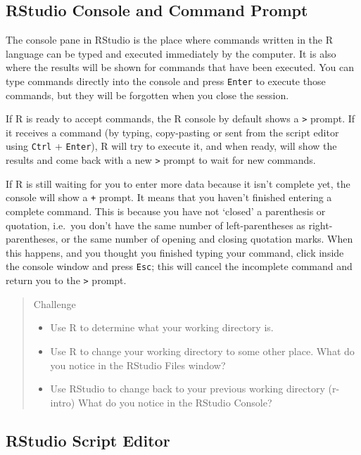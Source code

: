 \documentclass[
]{book}
\providecommand{\tightlist}{%
  \setlength{\itemsep}{0pt}\setlength{\parskip}{0pt}}
\begin{document}
\hypertarget{rstudio-console-and-command-prompt}{%
\subsection{RStudio Console and Command Prompt}\label{rstudio-console-and-command-prompt}}

The console pane in RStudio is the place where commands written in the R
language can be typed and executed immediately by the computer. It is also where
the results will be shown for commands that have been executed. You can type
commands directly into the console and press \texttt{Enter} to execute those commands, but they will be forgotten when you close the session.

If R is ready to accept commands, the R console by default shows a \texttt{\textgreater{}} prompt. If it
receives a command (by typing, copy-pasting or sent from the script editor using
\texttt{Ctrl} + \texttt{Enter}), R will try to execute it, and when
ready, will show the results and come back with a new \texttt{\textgreater{}} prompt to wait for new
commands.

If R is still waiting for you to enter more data because it isn't complete yet,
the console will show a \texttt{+} prompt. It means that you haven't finished entering
a complete command. This is because you have not `closed' a parenthesis or
quotation, i.e.~you don't have the same number of left-parentheses as
right-parentheses, or the same number of opening and closing quotation marks.
When this happens, and you thought you finished typing your command, click
inside the console window and press \texttt{Esc}; this will cancel the incomplete
command and return you to the \texttt{\textgreater{}} prompt.

\begin{quote}
Challenge

\begin{itemize}
\tightlist
\item
  Use R to determine what your working directory is.
\item
  Use R to change your working directory to some other place. What do you notice in the RStudio Files window?
\item
  Use RStudio to change back to your previous working directory (r-intro) What do you notice in the RStudio Console?
\end{itemize}
\end{quote}

\hypertarget{rstudio-script-editor}{%
\subsection{RStudio Script Editor}\label{rstudio-script-editor}}
\end{document}
